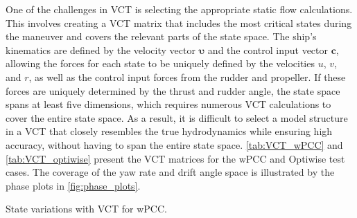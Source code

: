 One of the challenges in VCT is selecting the appropriate static flow calculations. This involves creating a VCT matrix that includes the most critical states during the maneuver and covers the relevant parts of the state space.
The ship's kinematics are defined by the velocity vector $\pmb{\upsilon}$ and the control input vector $\mathbf{c}$, allowing the forces for each state to be uniquely defined by the velocities $u$, $v$, and $r$, as well as the control input forces from the rudder and propeller. If these forces are uniquely determined by the thrust and rudder angle, the state space spans at least five dimensions, which requires numerous VCT calculations to cover the entire state space. As a result, it is difficult to select a model structure in a VCT that closely resembles the true hydrodynamics while ensuring high accuracy, without having to span the entire state space.
\autoref{tab:VCT_wPCC} and \autoref{tab:VCT_optiwise} present the VCT matrices for the wPCC and Optiwise test cases. The coverage of the yaw rate and drift angle space is illustrated by the phase plots in \autoref{fig:phase_plots}.
\begin{table}[h]
    \centering
    \small
    \caption{State variations with VCT for wPCC.}
    \label{tab:VCT_wPCC}
\end{table}
